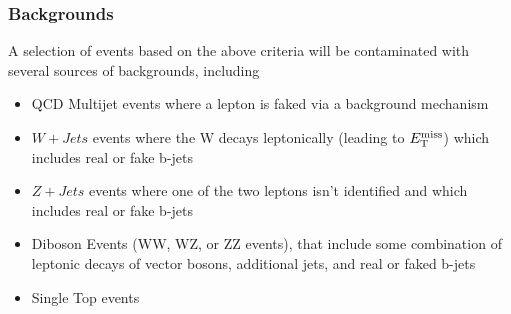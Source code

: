 \subsubsection{Backgrounds}
A selection of events based on the above criteria will be contaminated with several sources of backgrounds, including

\begin{itemize}
\item QCD Multijet events where a lepton is faked via a background mechanism
\item $W+Jets$ events where the W decays leptonically (leading to $E_{\mathrm{T}}^{\mathrm{miss}}$) which includes real or fake b-jets
\item $Z+Jets$ events where one of the two leptons isn't identified and which includes real or fake b-jets
\item Diboson Events (WW, WZ, or ZZ events), that include some combination of leptonic decays of vector bosons, additional jets, and real or faked b-jets
\item Single Top events
\end{itemize}


